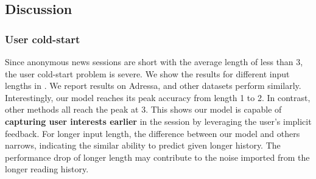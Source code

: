 \subsection{Discussion}
\label{sec:discuss}

\subsubsection{User cold-start}
\label{sec:usercold}
Since anonymous news sessions are short with the average length of less than 3, 
the user cold-start problem is severe. We show the results for different input lengths in 
. We report results on Adressa, and other datasets perform similarly. Interestingly, our model reaches its peak accuracy from length 1 to 2. 
In contrast, other methods all reach the peak at 3.
This shows our model is capable of \textbf{capturing user interests earlier} in the session 
by leveraging the user's implicit feedback. For longer input length, 
the difference between our model and others narrows, 
indicating the similar ability to predict given longer history. The performance drop of longer length may contribute to the noise imported from the longer reading history.

